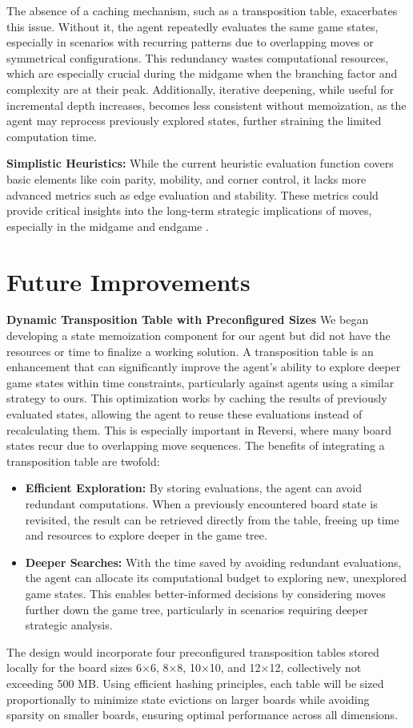 \documentclass[11pt]{article}
\begin{document}
The absence of a caching mechanism, such as a transposition table, exacerbates this issue. Without it, the agent repeatedly evaluates the same game states, especially in scenarios with recurring patterns due to overlapping moves or symmetrical configurations. This redundancy wastes computational resources, which are especially crucial during the midgame when the branching factor and complexity are at their peak. Additionally, iterative deepening, while useful for incremental depth increases, becomes less consistent without memoization, as the agent may reprocess previously explored states, further straining the limited computation time.


\noindent \textbf{Simplistic Heuristics:}  
While the current heuristic evaluation function covers basic elements like coin parity, mobility, and corner control, it lacks more advanced metrics such as edge evaluation and stability. These metrics could provide critical insights into the long-term strategic implications of moves, especially in the midgame and endgame \cite{heuristics_in_othello}.

\section*{Future Improvements}
\noindent \textbf{Dynamic Transposition Table with Preconfigured Sizes}  
We began developing a state memoization component for our agent but did not have the resources or time to finalize a working solution. A transposition table is an enhancement that can significantly improve the agent's ability to explore deeper game states within time constraints, particularly against agents using a similar strategy to ours. This optimization works by caching the results of previously evaluated states, allowing the agent to reuse these evaluations instead of recalculating them. This is especially important in Reversi, where many board states recur due to overlapping move sequences. The benefits of integrating a transposition table are twofold:
\begin{itemize}
    \item \textbf{Efficient Exploration:} By storing evaluations, the agent can avoid redundant computations. When a previously encountered board state is revisited, the result can be retrieved directly from the table, freeing up time and resources to explore deeper in the game tree.
    \item \textbf{Deeper Searches:} With the time saved by avoiding redundant evaluations, the agent can allocate its computational budget to exploring new, unexplored game states. This enables better-informed decisions by considering moves further down the game tree, particularly in scenarios requiring deeper strategic analysis.
\end{itemize}
The design would incorporate four preconfigured transposition tables stored locally for the board sizes 6×6, 8×8, 10×10, and 12×12, collectively not exceeding 500 MB. Using efficient hashing principles, each table will be sized proportionally to minimize state evictions on larger boards while avoiding sparsity on smaller boards, ensuring optimal performance across all dimensions.
\end{document}
